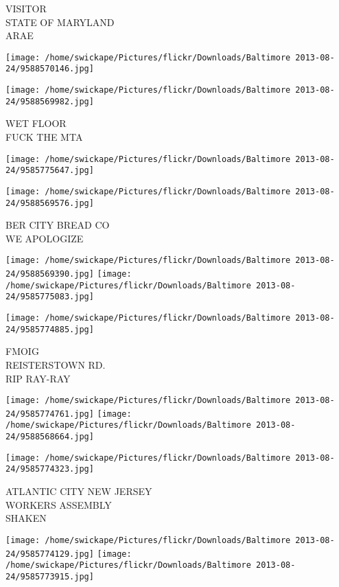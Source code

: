 \documentclass[10pt,letterpaper]{article}
\begin{document}
VISITOR\\
STATE OF MARYLAND\\
ARAE
\pagebreak

\texttt{[image: /home/swickape/Pictures/flickr/Downloads/Baltimore 2013-08-24/9588570146.jpg]}

\vspace{0.25in}
\texttt{[image: /home/swickape/Pictures/flickr/Downloads/Baltimore 2013-08-24/9588569982.jpg]}

WET FLOOR\\
FUCK THE MTA
\pagebreak

\texttt{[image: /home/swickape/Pictures/flickr/Downloads/Baltimore 2013-08-24/9585775647.jpg]}

\vspace{0.25in}
\texttt{[image: /home/swickape/Pictures/flickr/Downloads/Baltimore 2013-08-24/9588569576.jpg]}

BER CITY BREAD CO\\
WE APOLOGIZE
\pagebreak

\texttt{[image: /home/swickape/Pictures/flickr/Downloads/Baltimore 2013-08-24/9588569390.jpg]}
\texttt{[image: /home/swickape/Pictures/flickr/Downloads/Baltimore 2013-08-24/9585775083.jpg]}

\vspace{0.25in}
\texttt{[image: /home/swickape/Pictures/flickr/Downloads/Baltimore 2013-08-24/9585774885.jpg]}

FMOIG\\
REISTERSTOWN RD.\\
RIP RAY{-}RAY
\pagebreak

\texttt{[image: /home/swickape/Pictures/flickr/Downloads/Baltimore 2013-08-24/9585774761.jpg]}
\texttt{[image: /home/swickape/Pictures/flickr/Downloads/Baltimore 2013-08-24/9588568664.jpg]}

\vspace{0.25in}
\texttt{[image: /home/swickape/Pictures/flickr/Downloads/Baltimore 2013-08-24/9585774323.jpg]}

ATLANTIC CITY NEW JERSEY\\
WORKERS ASSEMBLY\\
SHAKEN
\pagebreak

\texttt{[image: /home/swickape/Pictures/flickr/Downloads/Baltimore 2013-08-24/9585774129.jpg]}
\texttt{[image: /home/swickape/Pictures/flickr/Downloads/Baltimore 2013-08-24/9585773915.jpg]}
\end{document}
